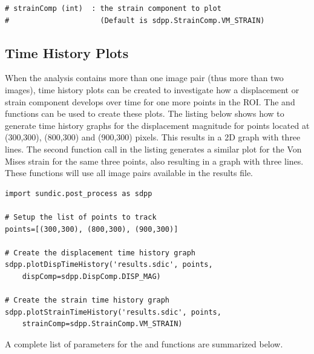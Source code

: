 \begin{lstlisting}
# strainComp (int)  : the strain component to plot
#                     (Default is sdpp.StrainComp.VM_STRAIN)
\end{lstlisting}

\subsection{Time History Plots}
When the analysis contains more than one image pair (thus more than two images), time history plots can be created to investigate how a displacement or strain component develops over time for one more points in the ROI.  The  and  functions can be used to create these plots.  The listing below shows how to generate time history graphs for the displacement magnitude for points located at (300,300), (800,300) and (900,300) pixels.  This results in a 2D graph with three lines.  The second function call in the listing generates a similar plot for the Von Mises strain for the same three points, also resulting in a graph with three lines.  These functions will use all image pairs available in the results file.

\begin{lstlisting}
import sundic.post_process as sdpp

# Setup the list of points to track
points=[(300,300), (800,300), (900,300)]

# Create the displacement time history graph
sdpp.plotDispTimeHistory('results.sdic', points, 
	dispComp=sdpp.DispComp.DISP_MAG)

# Create the strain time history graph
sdpp.plotStrainTimeHistory('results.sdic', points, 
	strainComp=sdpp.StrainComp.VM_STRAIN)
\end{lstlisting}

A complete list of parameters for the  and  functions are summarized below.

